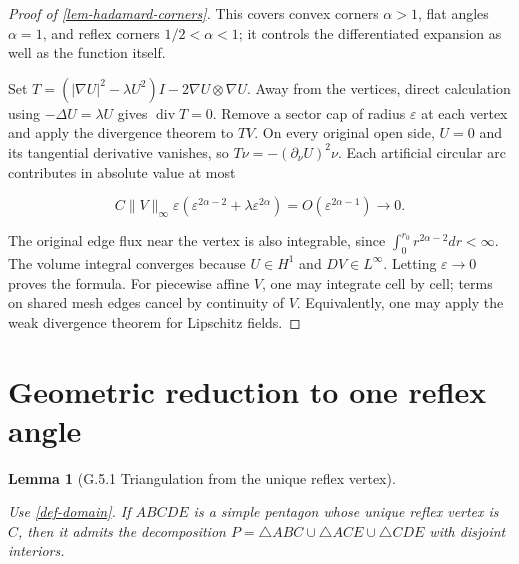 \documentclass[11pt,a4paper]{article}
\theoremstyle{proofmanuscript}
\newtheorem{lemma}[theorem]{Lemma}
\begin{document}
\begin{proof}[Proof of \ref{lem-hadamard-corners}]
This covers convex corners \(\alpha>1\), flat angles \(\alpha=1\), and reflex corners \(1/2<\alpha<1\); it controls the differentiated expansion as well as the function itself.

Set \(T=(|\nabla U|^2-\lambda U^2)I-2\nabla U\otimes\nabla U\). Away from the vertices, direct calculation using \(-\Delta U=\lambda U\) gives \(\operatorname{div}T=0\). Remove a sector cap of radius \(\varepsilon\) at each vertex and apply the divergence theorem to \(TV\). On every original open side, \(U=0\) and its tangential derivative vanishes, so \(T\nu=-(\partial_\nu U)^2\nu\). Each artificial circular arc contributes in absolute value at most

\[
C\|V\|_\infty\varepsilon(\varepsilon^{2\alpha-2}+\lambda\varepsilon^{2\alpha})
=O(\varepsilon^{2\alpha-1})\longrightarrow0.
\]

The original edge flux near the vertex is also integrable, since \(\int_0^{r_0}r^{2\alpha-2}dr<\infty\). The volume integral converges because \(U\in H^1\) and \(DV\in L^\infty\). Letting \(\varepsilon\to0\) proves the formula. For piecewise affine \(V\), one may integrate cell by cell; terms on shared mesh edges cancel by continuity of \(V\). Equivalently, one may apply the weak divergence theorem for Lipschitz fields.

\end{proof}


\section{Geometric reduction to one reflex angle}

\begin{lemma}[G.5.1 Triangulation from the unique reflex vertex]\label{lem-reflex-fan}

Use \ref{def-domain}. If \(ABCDE\) is a simple pentagon whose unique reflex vertex is \(C\), then it admits the decomposition \(P=\triangle ABC\cup\triangle ACE\cup\triangle CDE\) with disjoint interiors.

\end{lemma}
\end{document}
